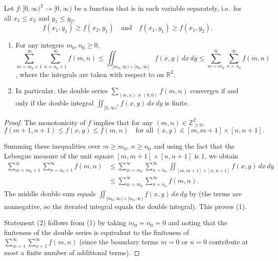 \begin{theorem} \label{theorem:comparison_of_double_series_to_double_integrals_of_nonnegative_functions}
    Let $f : [0,\infty)^2 \to [0,\infty)$ be a function that is  in each variable separately, i.e.\ for all $x_1 \le x_2$ and $y_1 \le y_2$,
    $$f(x_1,y_1) \ge f(x_2,y_1) \quad\text{and}\quad f(x_1,y_1) \ge f(x_1,y_2).$$

    \begin{enumerate}
        \item For any integers $m_0, n_0 \ge 0$,
        $$\sum_{m=m_0+1}^\infty \sum_{n=n_0+1}^\infty f(m,n) \le \iint_{[m_0,\infty) \times [n_0,\infty)} f(x,y)\,dx\,dy \le \sum_{m=m_0}^\infty \sum_{n=n_0}^\infty f(m,n)$$
        ,
        where the integrals are taken with respect to  on $\mathbb{R}^2$.
        \item In particular, the double series $\sum_{(m,n) \neq (0,0)} f(m,n)$ converges if and only if the double integral $\iint_{[0,\infty)^2} f(x,y)\,dx\,dy$ is finite.
    \end{enumerate}
\end{theorem}

\begin{proof}
    The monotonicity of $f$ implies that for any $(m,n) \in \mathbb{Z}_{\ge 0}^2$,
    $$f(m+1,n+1) \le f(x,y) \le f(m,n) \quad\text{for all } (x,y) \in [m,m+1] \times [n,n+1].$$

    Summing these inequalities over $m \ge m_0$, $n \ge n_0$ and using the fact that the Lebesgue measure of the unit square $[m,m+1] \times [n,n+1]$ is $1$, we obtain
    \begin{align*}
        \sum_{m=m_0+1}^\infty \sum_{n=n_0+1}^\infty f(m,n)
        &\le \sum_{m=m_0}^\infty \sum_{n=n_0}^\infty \iint_{[m,m+1] \times [n,n+1]} f(x,y)\,dx\,dy \\
        &\le \sum_{m=m_0}^\infty \sum_{n=n_0}^\infty f(m,n).
    \end{align*}
    The middle double sum equals $\iint_{[m_0,\infty) \times [n_0,\infty)} f(x,y)\,dx\,dy$ by  (the terms are nonnegative, so the iterated integral equals the double integral). This proves (1).

    Statement (2) follows from (1) by taking $m_0 = n_0 = 0$ and noting that the finiteness of the double series is equivalent to the finiteness of $\sum_{m=1}^\infty \sum_{n=1}^\infty f(m,n)$ (since the boundary terms $m=0$ or $n=0$ contribute at most a finite number of additional terms).
\end{proof}